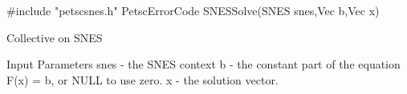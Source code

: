 #include "petscsnes.h"  
PetscErrorCode  SNESSolve(SNES snes,Vec b,Vec x)

Collective on SNES

Input Parameters
snes - the SNES context
b    - the constant part of the equation F(x) = b, or NULL to use zero.
x    - the solution vector.
        
